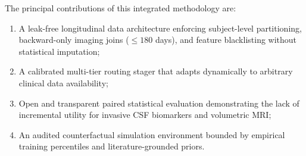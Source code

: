 The principal contributions of this integrated methodology are:
\begin{enumerate}
    \item A leak-free longitudinal data architecture enforcing subject-level partitioning, backward-only imaging joins ($\le 180$ days), and feature blacklisting without statistical imputation;
    \item A calibrated multi-tier routing stager that adapts dynamically to arbitrary clinical data availability;
    \item Open and transparent paired statistical evaluation demonstrating the lack of incremental utility for invasive CSF biomarkers and volumetric MRI;
    \item An audited counterfactual simulation environment bounded by empirical training percentiles and literature-grounded priors.
\end{enumerate}
